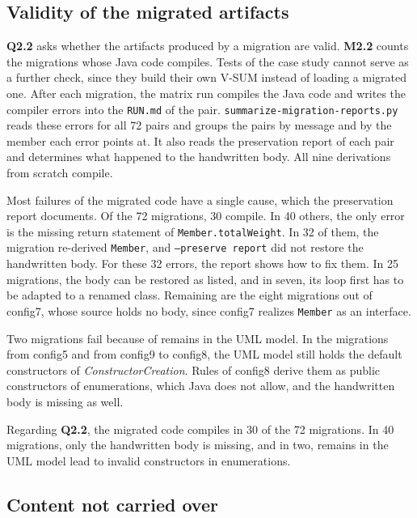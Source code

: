 \subsection{Validity of the migrated artifacts}
\label{sec:Evaluation:MigrationQuality:ValidityOfTheMigratedArtifacts}

\textbf{Q2.2} asks whether the artifacts produced by a migration are valid.
\textbf{M2.2} counts the migrations whose Java code compiles.
Tests of the case study cannot serve as a further check, since they build their own V-SUM instead of loading a migrated one.
After each migration, the matrix run compiles the Java code and writes the compiler errors into the \texttt{RUN.md} of the pair.
\texttt{summarize-migration-reports.py} reads these errors for all 72 pairs and groups the pairs by message and by the member each error points at.
It also reads the preservation report of each pair and determines what happened to the handwritten body.
All nine derivations from scratch compile.

Most failures of the migrated code have a single cause, which the preservation report documents.
Of the 72 migrations, 30 compile.
In 40 others, the only error is the missing return statement of \texttt{Member.totalWeight}.
In 32 of them, the migration re-derived \texttt{Member}, and \texttt{--preserve report} did not restore the handwritten body.
For these 32 errors, the report shows how to fix them.
In 25 migrations, the body can be restored as listed, and in seven, its loop first has to be adapted to a renamed class.
Remaining are the eight migrations out of config7, whose source holds no body, since config7 realizes \texttt{Member} as an interface.

Two migrations fail because of remains in the UML model.
In the migrations from config5 and from config9 to config8, the UML model still holds the default constructors of \textit{ConstructorCreation}.
Rules of config8 derive them as public constructors of enumerations, which Java does not allow, and the handwritten body is missing as well.

Regarding \textbf{Q2.2}, the migrated code compiles in 30 of the 72 migrations.
In 40 migrations, only the handwritten body is missing, and in two, remains in the UML model lead to invalid constructors in enumerations.

\subsection{Content not carried over}
\label{sec:Evaluation:MigrationQuality:ContentNotCarriedOver}

